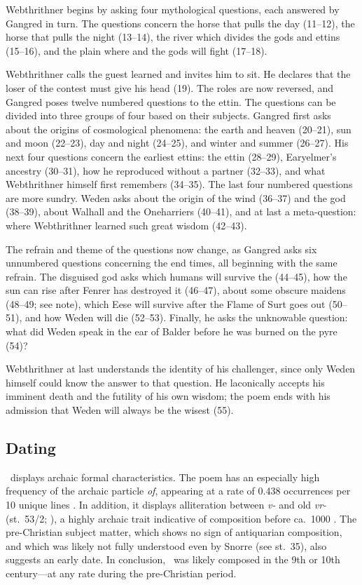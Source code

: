 Webthrithner begins by asking four mythological questions, each answered by Gangred in turn. The questions concern the horse that pulls the day (11--12), the horse that pulls the night (13--14), the river which divides the gods and ettins (15--16), and the plain where  and the gods will fight (17--18).

Webthrithner calls the guest learned and invites him to sit.  He declares that the loser of the contest must give his head (19).  The roles are now reversed, and Gangred poses twelve numbered questions to the ettin.  The questions can be divided into three groups of four based on their subjects.  Gangred first asks about the origins of cosmological phenomena: the earth and heaven (20--21), sun and moon (22--23), day and night (24--25), and winter and summer (26--27).  His next four questions concern the earliest ettins: the ettin  (28--29), Earyelmer’s ancestry (30--31), how he reproduced without a partner (32--33), and what Webthrithner himself first remembers (34--35).  The last four numbered questions are more sundry.  Weden asks about the origin of the wind (36--37) and the god  (38--39), about Walhall and the Oneharriers (40--41), and at last a meta-question: where Webthrithner learned such great wisdom (42--43).

The refrain and theme of the questions now change, as Gangred asks six unnumbered questions concerning the end times, all beginning with the same refrain.  The disguised god asks which humans will survive the  (44--45), how the sun can rise after Fenrer has destroyed it (46--47), about some obscure maidens (48--49; see note), which Eese will survive after the Flame of Surt goes out (50--51), and how Weden will die (52--53).  Finally, he asks the unknowable question: what did Weden speak in the ear of Balder before he was burned on the pyre (54)?

Webthrithner at last understands the identity of his challenger, since only Weden himself could know the answer to that question.  He laconically accepts his imminent death and the futility of his own wisdom; the poem ends with his admission that Weden will always be the wisest (55).

\subsection{Dating}

\Vafthrudnismal\ displays archaic formal characteristics.  The poem has an especially high frequency of the archaic particle \emph{of}, appearing at a rate of 0.438 occurrences per 10 unique lines \parencite[70]{Sapp2022}.  In addition, it displays alliteration between \emph{v-} and old \emph{vr-} (st.~53/2; \cite[37]{Haukur2016}), a highly archaic trait indicative of composition before ca.~1000 \ce.  The pre-Christian subject matter, which shows no sign of antiquarian composition, and which was likely not fully understood even by Snorre (see st.~35), also suggests an early date.  In conclusion, \Vafthrudnismal\ was likely composed in the 9th or 10th century---at any rate during the pre-Christian period.

